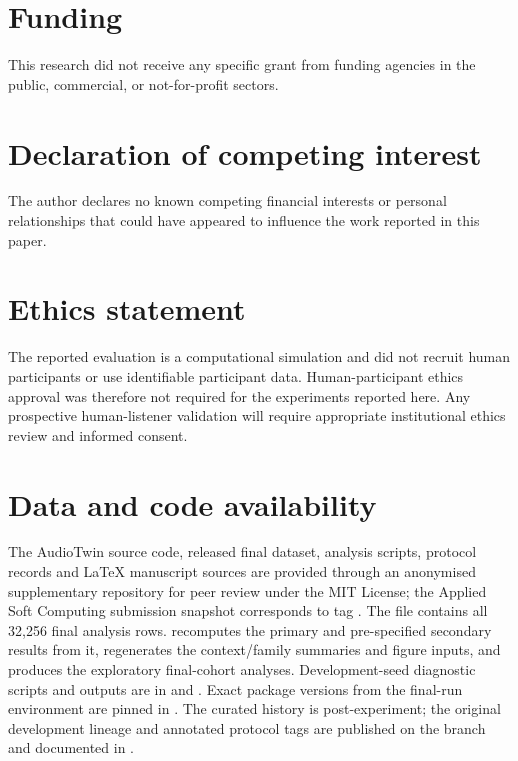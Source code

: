 \documentclass[preprint,12pt]{elsarticle}
\begin{document}
\section*{Funding}
This research did not receive any specific grant from funding agencies in the public, commercial, or not-for-profit sectors.

\section*{Declaration of competing interest}
The author declares no known competing financial interests or personal relationships that could have appeared to influence the work reported in this paper.

\section*{Ethics statement}
The reported evaluation is a computational simulation and did not recruit human participants or use identifiable participant data. Human-participant ethics approval was therefore not required for the experiments reported here. Any prospective human-listener validation will require appropriate institutional ethics review and informed consent.

\section*{Data and code availability}
The AudioTwin source code, released final dataset, analysis scripts, protocol records and LaTeX manuscript sources are provided through an anonymised supplementary repository for peer review under the MIT License; the Applied Soft Computing submission snapshot corresponds to tag . The file  contains all 32,256 final analysis rows.  recomputes the primary and pre-specified secondary results from it,  regenerates the context/family summaries and figure inputs, and  produces the exploratory final-cohort analyses. Development-seed diagnostic scripts and outputs are in  and . Exact package versions from the final-run environment are pinned in . The curated  history is post-experiment; the original development lineage and annotated protocol tags are published on the  branch and documented in .
\end{document}
